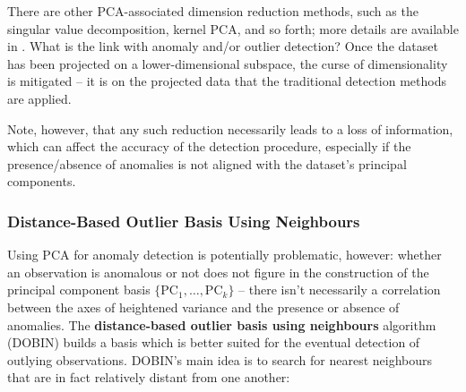 \noindent There are other PCA-associated dimension reduction methods, such as the singular value decomposition, kernel PCA, and so forth; more details are available in \cite{BLMMP}.
\newl What is the link with anomaly and/or outlier detection? Once the dataset has been projected on a lower-dimensional subspace, the curse of dimensionality is mitigated -- it is on the projected data that the traditional detection methods are applied. \par Note, however, that any such reduction necessarily leads to a loss of information, which can affect the accuracy of the detection procedure, especially if the presence/absence of anomalies is not aligned with the dataset's principal components. 

\subsubsection*{Distance-Based Outlier Basis Using Neighbours}
Using PCA for anomaly detection is potentially problematic, however: whether an observation is anomalous or not does not figure in the construction of the principal component basis $\{\text{PC}_1,\ldots,\text{PC}_k\}$ -- there isn't necessarily a correlation between the axes of heightened variance and the presence or absence of anomalies. 
\newl 
The \textbf{distance-based outlier basis using neighbours} algorithm (DOBIN) builds a basis which is better suited for the eventual detection of outlying observations. DOBIN's main idea is to search for nearest neighbours that are in fact relatively distant from one another: 
